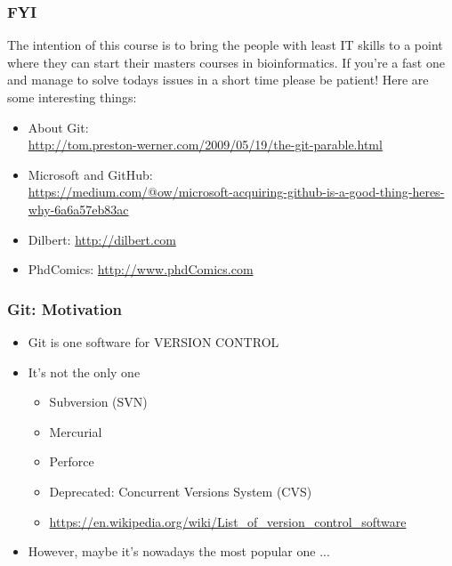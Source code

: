 \documentclass{beamer} %
\begin{document}
\begin{frame}
\frametitle{FYI}

The intention of this course is to bring the people with least IT skills to a point where
they can start their masters courses in bioinformatics.\newline \newline
If you're a fast one and manage to solve todays issues in a short time please be patient! Here are some interesting things:

\begin{itemize}
    \setlength\itemsep{1em}
	\item About Git: \\ \url{http://tom.preston-werner.com/2009/05/19/the-git-parable.html}
	\item Microsoft and GitHub: \\ \url{https://medium.com/@ow/microsoft-acquiring-github-is-a-good-thing-heres-why-6a6a57eb83ac}
    \item Dilbert: \url{http://dilbert.com}
    \item PhdComics: \url{http://www.phdComics.com}
\end{itemize}
\end{frame}

\begin{frame}[t]
\frametitle{Git: Motivation}
\begin{itemize}
    \setlength\itemsep{1em}
	\item Git is one software for VERSION CONTROL \newline
    \item It's not the only one
    
	\begin{itemize}
    	\setlength\itemsep{0.4em}
		\item Subversion (SVN)
        \item Mercurial
        \item Perforce 
        \item Deprecated: Concurrent Versions System (CVS)
        \item \href{https://en.wikipedia.org/wiki/List_of_version_control_software}{https://en.wikipedia.org/wiki/List\_of\_version\_control\_software} 
	\end{itemize}
    
    \item However, maybe it's nowadays the most popular one ...
    
\end{itemize}
\end{frame}
\end{document}
